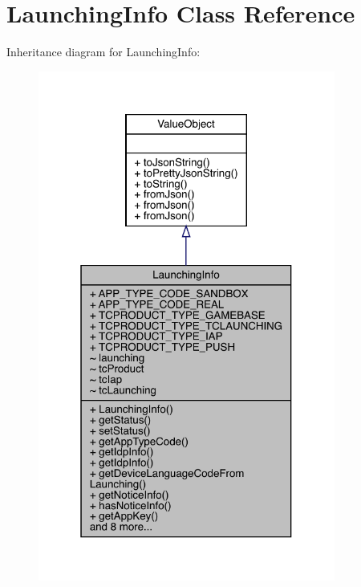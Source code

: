\hypertarget{classcom_1_1toast_1_1android_1_1gamebase_1_1launching_1_1data_1_1_launching_info}{}\section{Launching\+Info Class Reference}
\label{classcom_1_1toast_1_1android_1_1gamebase_1_1launching_1_1data_1_1_launching_info}


Inheritance diagram for Launching\+Info\+:
\nopagebreak
\begin{figure}[H]
\begin{center}
\leavevmode
\includegraphics[width=277pt]{classcom_1_1toast_1_1android_1_1gamebase_1_1launching_1_1data_1_1_launching_info__inherit__graph}
\end{center}
\end{figure}


